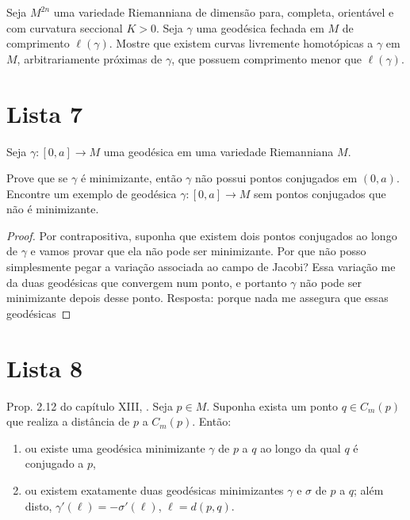 \begin{exercise}
\label{exercise-l6-6}
Seja $M^{2n}$ uma variedade Riemanniana de dimensão para, completa, orientável e
com curvatura seccional $K>0$. Seja $\gamma$ uma geodésica fechada em $M$ de
comprimento $\ell(\gamma)$. Mostre que existem curvas livremente homotópicas a
$\gamma$ em $M$, arbitrariamente próximas de $\gamma$, que possuem comprimento
menor que $\ell(\gamma)$.
\end{exercise}


\section{Lista 7}
\label{section-lista-7}

\begin{exercise}
\label{exercise-minimizing-implies-no-conjugate-points}
Seja $\gamma:[0,a]\to M$ uma geodésica em uma variedade Riemanniana $M$.

 Prove que se $\gamma$ é minimizante, então $\gamma$ não possui pontos
 conjugados em  $(0,a)$. Encontre um exemplo de geodésica $\gamma:[0,a] \to M$ 
sem pontos conjugados que não é minimizante.
\end{exercise}

\begin{proof}
Por contrapositiva, suponha que existem dois pontos conjugados
 ao longo de $\gamma$ e vamos provar que ela não pode ser minimizante. 
Por que não posso simplesmente pegar a variação associada ao campo de 
Jacobi? Essa variação me da duas geodésicas que convergem num ponto,
 e portanto $\gamma$ não pode ser minimizante depois desse ponto. 
Resposta: porque nada me assegura que essas geodésicas 
\end{proof}

\section{Lista 8}
\label{section-lista-8}

\begin{exercise}
\label{exercise-l8-1}
Prop. 2.12 do capítulo XIII, \cite{doc}. Seja $p \in M$. 
Suponha exista um ponto $q \in C_m(p)$ que realiza a distância de $p$ a 
$C_m(p)$. Então:
\begin{enumerate}
\item ou existe uma geodésica 
minimizante $\gamma$ de $p$ a $q$ ao longo da qual $q$ é 
conjugado a $p$,
\item ou existem exatamente duas geodésicas 
minimizantes $\gamma$ e $\sigma$ de $p$ a $q$; além disto,
$\gamma'(\ell)=-\sigma'(\ell)$, 
$\ell=d(p,q)$. 
\end{enumerate}
\end{exercise}

